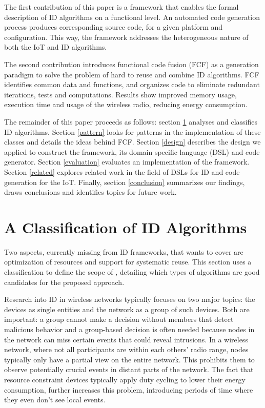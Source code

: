 \documentclass[conference]{IEEEtran}
\begin{document}

The first contribution of this paper is a framework that enables the formal
description of ID algorithms on a functional level. An automated code
generation process produces corresponding source code, for a given platform and
configuration. This way, the framework addresses the heterogeneous nature of
both the IoT and ID algorithms.


The second contribution introduces functional code fusion (FCF) as a generation
paradigm to solve the problem of hard to reuse and combine ID algorithms. FCF
identifies common data and functions, and organizes code to eliminate redundant
iterations, tests and computations. Results show improved memory usage,
execution time and usage of the wireless radio, reducing energy consumption.


The remainder of this paper proceeds as follows: section \ref{classification}
analyses and classifies ID algorithms. Section \ref{pattern} looks for patterns
in the implementation of these classes and details the ideas behind FCF\@.
Section \ref{design} describes the design we applied to construct the
framework, its domain specific language (DSL) and code generator. Section
\ref{evaluation} evaluates an implementation of the framework. Section
\ref{related} explores related work in the field of DSLs for ID and code
generation for the IoT\@. Finally, section \ref{conclusion} summarizes our
findings, draws conclusions and identifies topics for future work.

\section{A Classification of ID Algorithms}
\label{classification}

Two aspects, currently missing from ID frameworks, that \NAME wants to cover
are optimization of resources and support for systematic reuse. This section
uses a classification to define the scope of \NAME, detailing which types of
algorithms are good candidates for the proposed approach.

Research into ID in wireless networks typically focuses on two major topics:
the devices as single entities and the network as a group of such devices. Both
are important: a group cannot make a decision without members that detect
malicious behavior and a group-based decision is often needed because nodes in
the network can miss certain events that could reveal intrusions. In a wireless
network, where not all participants are within each others' radio range, nodes
typically only have a partial view on the entire network. This prohibits them
to observe potentially crucial events in distant parts of the network. The fact
that resource constraint devices typically apply duty cycling to lower their
energy consumption, further increases this problem, introducing periods of time
where they even don't see local events.
\end{document}
